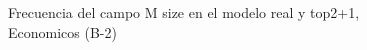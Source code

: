 \begin{figure}[H]
    \centering
    
    \caption{Frecuencia del campo M size en el modelo real y top2+1, Economicos (B-2)}
    \label{frecuency-M Size-top2+1}
\end{figure}